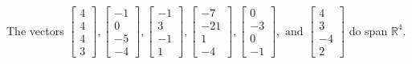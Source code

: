\begin{exercise}
\begin{exerciseStatement}
  \end{exerciseStatement}
  \begin{exerciseAnswer}
   The vectors \(\left[\begin{array}{r}
4 \\
4 \\
4 \\
3
\end{array}\right] , \left[\begin{array}{r}
-1 \\
0 \\
-5 \\
-4
\end{array}\right] , \left[\begin{array}{r}
-1 \\
3 \\
-1 \\
1
\end{array}\right] , \left[\begin{array}{r}
-7 \\
-21 \\
1 \\
-4
\end{array}\right] , \left[\begin{array}{r}
0 \\
-3 \\
0 \\
-1
\end{array}\right] , \text{ and } \left[\begin{array}{r}
4 \\
3 \\
-4 \\
2
\end{array}\right]\) 
  	 do  
	span \(\mathbb{R}^4\).
  


  \end{exerciseAnswer}
\end{exercise}